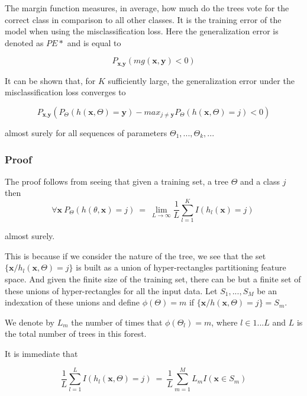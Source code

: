 The margin function measures, in average, how much do the trees vote for the correct class in comparison to all other classes. It is the training error of the model when using the misclassification loss. Here the generalization error is denoted as $PE*$ and is equal to 

\begin{equation}
P_{\textbf{x}, \textbf{y} }(mg(\textbf{x},\textbf{y}) <0)
\end{equation}

 It can be shown that, for $K$ sufficiently large, the generalization error under the misclassification loss converges to

\begin{equation}
 P_{\textbf{x}, \textbf{y} } ( P_{\Theta} (h(\textbf{x}, \Theta) = \textbf{y}) - max_{j \neq \textbf{y}} P_{\Theta} (h(\textbf{x}, \Theta) = j) < 0) 
 \end{equation}

almost surely for all sequences of parameters $\Theta_1, ..., \Theta_k,...$

\subsubsection{Proof}
The proof follows from seeing that given a training set, a tree $\Theta$ and a class $j$ then
\begin{equation}
\forall \textbf{x}  \ P_\Theta(h(\theta,\textbf{x}) = j) \ = \
\lim_{L\to\infty} \frac{1}{L} \sum_{l=1}^K I(h_l(\textbf{x}) = j) \ 
\end{equation}

almost surely.

This is because if we consider the nature of the tree, we see that the set $\{\textbf{x} / h_l(\textbf{x}, \Theta) = j \}$ is built as a union of hyper-rectangles partitioning feature space. And given the finite size of the training set, there can be but a finite set of these unions of hyper-rectangles for all the input data. Let $S_1, ..., S_M$ be an indexation of these unions and define $\phi(\Theta) = m $ if $\{\textbf{x} / h(\textbf{x}, \Theta) = j \} = S_m$.

We denote by $L_m$ the number of times that $\phi(\Theta_l) =m $, where $l \in {1...L}$ and $L$ is the total number of trees in this forest.

It is immediate that

\begin{equation}\label{rf-PEconvergence1}
\frac{1}{L} \sum_{l=1}^L I(h_l(\textbf{x},\Theta) = j) \ = \ \frac{1}{L} \sum_{m=1}^M L_m I(\textbf{x} \in S_m)
\end{equation}

